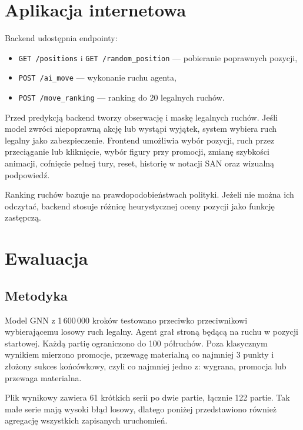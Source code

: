 \documentclass[12pt,a4paper]{article}
\newcommand{\code}[1]{\texttt{#1}}
\begin{document}
\section{Aplikacja internetowa}

Backend udostępnia endpointy:

\begin{itemize}[leftmargin=*]
    \item \code{GET /positions} i \code{GET /random\_position} --- pobieranie
    poprawnych pozycji,
    \item \code{POST /ai\_move} --- wykonanie ruchu agenta,
    \item \code{POST /move\_ranking} --- ranking do 20 legalnych ruchów.
\end{itemize}

Przed predykcją backend tworzy obserwację i maskę legalnych ruchów. Jeśli model
zwróci niepoprawną akcję lub wystąpi wyjątek, system wybiera ruch legalny jako
zabezpieczenie. Frontend umożliwia wybór pozycji, ruch przez przeciąganie lub
kliknięcie, wybór figury przy promocji, zmianę szybkości animacji, cofnięcie
pełnej tury, reset, historię w notacji SAN oraz wizualną podpowiedź.

Ranking ruchów bazuje na prawdopodobieństwach polityki. Jeżeli nie można ich
odczytać, backend stosuje różnicę heurystycznej oceny pozycji jako funkcję
zastępczą.

\section{Ewaluacja}

\subsection{Metodyka}

Model GNN z 1\,600\,000 kroków testowano przeciwko przeciwnikowi wybierającemu
losowy ruch legalny. Agent grał stroną będącą na ruchu w pozycji startowej.
Każdą partię ograniczono do 100 półruchów. Poza klasycznym wynikiem mierzono
promocje, przewagę materialną co najmniej 3 punkty i złożony sukces końcówkowy,
czyli co najmniej jedno z: wygrana, promocja lub przewaga materialna.

Plik wynikowy zawiera 61 krótkich serii po dwie partie, łącznie 122 partie.
Tak małe serie mają wysoki błąd losowy, dlatego poniżej przedstawiono również
agregację wszystkich zapisanych uruchomień.
\end{document}
